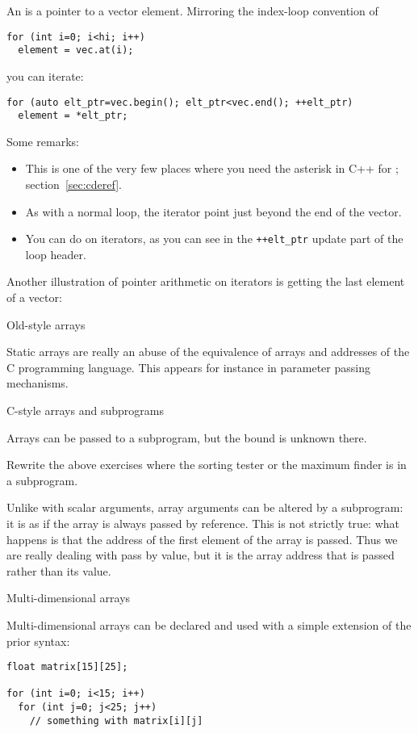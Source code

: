 An  is a pointer to a vector element. Mirroring
the index-loop convention of
\begin{verbatim}
for (int i=0; i<hi; i++)
  element = vec.at(i);
\end{verbatim}
you can iterate:
\begin{verbatim}
for (auto elt_ptr=vec.begin(); elt_ptr<vec.end(); ++elt_ptr)
  element = *elt_ptr;
\end{verbatim}
Some remarks:
\begin{itemize}
\item This is one of the very few places where you need the asterisk in C++
  for ; section~\ref{sec:cderef}.
\item As with a normal loop, the  iterator point just beyond the end
  of the vector.
\item You can do  on iterators, as
  you can see in the \verb-++elt_ptr- update part of the loop header.
\end{itemize}
Another illustration of pointer arithmetic on iterators is getting the
last element of a vector:
%

 {Old-style arrays}

Static arrays are really an abuse of the equivalence of arrays and
addresses of the C programming language. This appears for instance in
parameter passing mechanisms.

 {C-style arrays and subprograms}

Arrays can be passed to a subprogram, but the bound is unknown there.
%
%
\begin{exercise}
  Rewrite the above exercises where the sorting tester or the maximum
  finder is in a subprogram.
\end{exercise}

Unlike with scalar arguments, array arguments can be altered by a
subprogram: it is as if the array is always passed by reference. This is
not strictly true: what happens is that the address of the first
element of the array is passed. Thus we are really dealing with pass
by value, but it is the array address that is passed rather than its value.

 {Multi-dimensional arrays}

Multi-dimensional arrays can be declared and used with a simple extension of
the prior syntax:
\begin{verbatim}
float matrix[15][25];

for (int i=0; i<15; i++)
  for (int j=0; j<25; j++)
    // something with matrix[i][j]
\end{verbatim}

